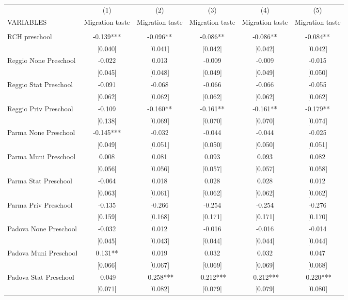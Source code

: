 \begin{tabular}{lccccc} \hline
 & (1) & (2) & (3) & (4) & (5) \\
VARIABLES & Migration taste & Migration taste & Migration taste & Migration taste & Migration taste \\ \hline
 &  &  &  &  &  \\
RCH preschool & -0.139*** & -0.096** & -0.086** & -0.086** & -0.084** \\
 & [0.040] & [0.041] & [0.042] & [0.042] & [0.042] \\
Reggio None Preschool & -0.022 & 0.013 & -0.009 & -0.009 & -0.015 \\
 & [0.045] & [0.048] & [0.049] & [0.049] & [0.050] \\
Reggio Stat Preschool & -0.091 & -0.068 & -0.066 & -0.066 & -0.055 \\
 & [0.062] & [0.062] & [0.062] & [0.062] & [0.062] \\
Reggio Priv Preschool & -0.109 & -0.160** & -0.161** & -0.161** & -0.179** \\
 & [0.138] & [0.069] & [0.070] & [0.070] & [0.074] \\
Parma None Preschool & -0.145*** & -0.032 & -0.044 & -0.044 & -0.025 \\
 & [0.049] & [0.051] & [0.050] & [0.050] & [0.051] \\
Parma Muni Preschool & 0.008 & 0.081 & 0.093 & 0.093 & 0.082 \\
 & [0.056] & [0.056] & [0.057] & [0.057] & [0.058] \\
Parma Stat Preschool & -0.064 & 0.018 & 0.028 & 0.028 & 0.012 \\
 & [0.063] & [0.061] & [0.062] & [0.062] & [0.062] \\
Parma Priv Preschool & -0.135 & -0.266 & -0.254 & -0.254 & -0.276 \\
 & [0.159] & [0.168] & [0.171] & [0.171] & [0.170] \\
Padova None Preschool & -0.032 & 0.012 & -0.016 & -0.016 & -0.014 \\
 & [0.045] & [0.043] & [0.044] & [0.044] & [0.044] \\
Padova Muni Preschool & 0.131** & 0.019 & 0.032 & 0.032 & 0.047 \\
 & [0.066] & [0.067] & [0.069] & [0.069] & [0.068] \\
Padova Stat Preschool & -0.049 & -0.258*** & -0.212*** & -0.212*** & -0.220*** \\
 & [0.071] & [0.082] & [0.079] & [0.079] & [0.080] \\

\end{tabular}
